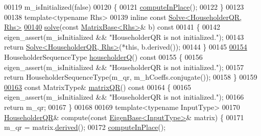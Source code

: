 \begin{DoxyCode}
00119         m\_isInitialized(false)
00120     \{
00121       \hyperlink{group___q_r___module_a3a16530338a734971fc45efb0ef9ac94}{computeInPlace}();
00122     \}
00123 
00138     \textcolor{keyword}{template}<\textcolor{keyword}{typename} Rhs>
00139     \textcolor{keyword}{inline} \textcolor{keyword}{const} \hyperlink{group___core___module_class_eigen_1_1_solve}{Solve<HouseholderQR, Rhs>}
\hyperlink{group___q_r___module_a3e8e56769bbaaed0616ad98c4ff99c7b}{00140}     \hyperlink{group___q_r___module_a3e8e56769bbaaed0616ad98c4ff99c7b}{solve}(\textcolor{keyword}{const} \hyperlink{group___core___module_class_eigen_1_1_matrix_base}{MatrixBase<Rhs>}& b)\textcolor{keyword}{ const}
00141 \textcolor{keyword}{    }\{
00142       eigen\_assert(m\_isInitialized && \textcolor{stringliteral}{"HouseholderQR is not initialized."});
00143       \textcolor{keywordflow}{return} \hyperlink{group___core___module_class_eigen_1_1_solve}{Solve<HouseholderQR, Rhs>}(*\textcolor{keyword}{this}, b.derived());
00144     \}
00145 
\hyperlink{group___q_r___module_affd506c10ef2d25f56e7b1f9f25ff885}{00154}     HouseholderSequenceType \hyperlink{group___q_r___module_affd506c10ef2d25f56e7b1f9f25ff885}{householderQ}()\textcolor{keyword}{ const}
00155 \textcolor{keyword}{    }\{
00156       eigen\_assert(m\_isInitialized && \textcolor{stringliteral}{"HouseholderQR is not initialized."});
00157       \textcolor{keywordflow}{return} HouseholderSequenceType(m\_qr, m\_hCoeffs.conjugate());
00158     \}
00159 
\hyperlink{group___q_r___module_ae837f2fb30099212c53b3042c7d699c9}{00163}     \textcolor{keyword}{const} MatrixType& \hyperlink{group___q_r___module_ae837f2fb30099212c53b3042c7d699c9}{matrixQR}()\textcolor{keyword}{ const}
00164 \textcolor{keyword}{    }\{
00165         eigen\_assert(m\_isInitialized && \textcolor{stringliteral}{"HouseholderQR is not initialized."});
00166         \textcolor{keywordflow}{return} m\_qr;
00167     \}
00168 
00169     \textcolor{keyword}{template}<\textcolor{keyword}{typename} InputType>
00170     \hyperlink{group___q_r___module_class_eigen_1_1_householder_q_r}{HouseholderQR}& compute(\textcolor{keyword}{const} \hyperlink{group___core___module_struct_eigen_1_1_eigen_base}{EigenBase<InputType>}& matrix) \{
00171       m\_qr = matrix.\hyperlink{group___core___module_a324b16961a11d2ecfd2d1b7dd7946545}{derived}();
00172       \hyperlink{group___q_r___module_a3a16530338a734971fc45efb0ef9ac94}{computeInPlace}();

\end{DoxyCode}
